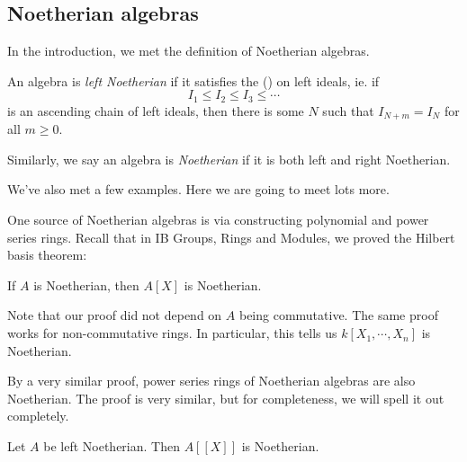 \documentclass[a4paper]{article}
\begin{document}
\subsection{Noetherian algebras}
In the introduction, we met the definition of Noetherian algebras.
\begin{defi}
  An algebra is \emph{left Noetherian} if it satisfies the  () on left ideals, ie. if
  \[
    I_1 \leq I_2 \leq I_3 \leq \cdots
  \]
  is an ascending chain of left ideals, then there is some $N$ such that $I_{N + m} = I_N$ for all $m \geq 0$.

  Similarly, we say an algebra is \emph{Noetherian} if it is both left and right Noetherian.
\end{defi}
We've also met a few examples. Here we are going to meet lots more.

One source of Noetherian algebras is via constructing polynomial and power series rings. Recall that in IB Groups, Rings and Modules, we proved the Hilbert basis theorem:
\begin{thm}
  If $A$ is Noetherian, then $A[X]$ is Noetherian.
\end{thm}
Note that our proof did not depend on $A$ being commutative. The same proof works for non-commutative rings. In particular, this tells us $k[X_1, \cdots, X_n]$ is Noetherian.

By a very similar proof, power series rings of Noetherian algebras are also Noetherian. The proof is very similar, but for completeness, we will spell it out completely.
\begin{thm}
  Let $A$ be left Noetherian. Then $A[[X]]$ is Noetherian.
\end{thm}
\end{document}
